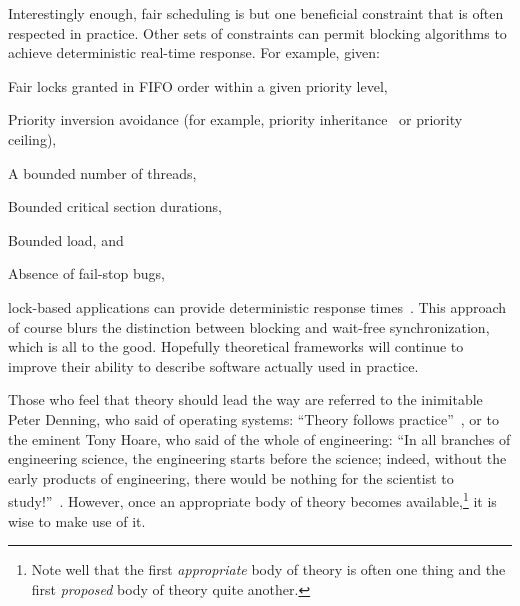 Interestingly enough, fair scheduling is but one beneficial
constraint that is often respected in practice.
Other sets of constraints can permit blocking algorithms to
achieve deterministic real-time response.
For example, given:
\begin{enumerate*}[(1)]
\item Fair locks granted in FIFO order within a given priority level,
\item Priority inversion avoidance (for example, priority
inheritance~\cite{Takada:1995:RSN:527074.828566,Cai-DongWang1996PrioInherLock}
or priority ceiling),
\item A bounded number of threads,
\item Bounded critical section durations,
\item Bounded load,
and
\item Absence of fail-stop bugs,
\end{enumerate*}
lock-based applications can provide deterministic
response times~\cite{BjoernBrandenburgPhD,DipankarSarma2004OLSscalability}.
This approach of course blurs the distinction between blocking and wait-free
synchronization, which is all to the good.
Hopefully theoretical frameworks will continue to improve their ability
to describe software actually used in practice.

Those who feel that theory should lead the way are referred to the
inimitable Peter Denning, who said of operating systems:
``Theory follows practice''~\cite{Denning:2015:POF:2830903.2830904},
or to the eminent Tony Hoare, who said of the whole of engineering:
``In all branches of engineering science, the engineering starts before
the science; indeed, without the early products of engineering, there
would be nothing for the scientist to
study!''~\cite{RichardMorris2007TonyHoareInterview}.
However, once an appropriate body of theory becomes available,\footnote{
	Note well that the first \emph{appropriate} body of theory is often one
	thing and the first \emph{proposed} body of theory quite another.}
it is wise to make use of it.



